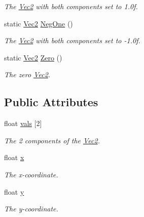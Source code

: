 \begin{DoxyCompactItemize}
\begin{DoxyCompactList}\small\item\em The \hyperlink{classgfxmath_1_1_vec2}{Vec2} with both components set to 1.\+0f. \end{DoxyCompactList}\item 
\hypertarget{classgfxmath_1_1_vec2_a529d9f9113b4b703340fb0244db12f4e}{}static \hyperlink{classgfxmath_1_1_vec2}{Vec2} \hyperlink{classgfxmath_1_1_vec2_a529d9f9113b4b703340fb0244db12f4e}{Neg\+One} ()\label{classgfxmath_1_1_vec2_a529d9f9113b4b703340fb0244db12f4e}

\begin{DoxyCompactList}\small\item\em The \hyperlink{classgfxmath_1_1_vec2}{Vec2} with both components set to -\/1.\+0f. \end{DoxyCompactList}\item 
\hypertarget{classgfxmath_1_1_vec2_a4d744d6545702363da04b0d0b1125319}{}static \hyperlink{classgfxmath_1_1_vec2}{Vec2} \hyperlink{classgfxmath_1_1_vec2_a4d744d6545702363da04b0d0b1125319}{Zero} ()\label{classgfxmath_1_1_vec2_a4d744d6545702363da04b0d0b1125319}

\begin{DoxyCompactList}\small\item\em The zero \hyperlink{classgfxmath_1_1_vec2}{Vec2}. \end{DoxyCompactList}\end{DoxyCompactItemize}
\subsection*{Public Attributes}
\begin{DoxyCompactItemize}
\item 
float \hyperlink{classgfxmath_1_1_vec2_a7ea0d3fc8b8a22e4358c9dff904480ab}{vals} \mbox{[}2\mbox{]}
\begin{DoxyCompactList}\small\item\em The 2 components of the \hyperlink{classgfxmath_1_1_vec2}{Vec2}. \end{DoxyCompactList}\item 
float \hyperlink{classgfxmath_1_1_vec2_ae822579debf2a7b9aab468fbb4ce218d}{x}
\begin{DoxyCompactList}\small\item\em The x-\/coordinate. \end{DoxyCompactList}\item 
float \hyperlink{classgfxmath_1_1_vec2_acfad5fd06cb37b0e0e5373f286e7d474}{y}
\begin{DoxyCompactList}\small\item\em The y-\/coordinate. \end{DoxyCompactList}\end{DoxyCompactItemize}
